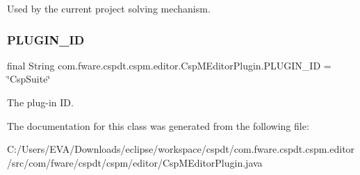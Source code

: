Used by the current project solving mechanism. 

\mbox{\label{classcom_1_1fware_1_1cspdt_1_1cspm_1_1editor_1_1_csp_m_editor_plugin_a52beb6e08f5faf5ef31066ebb304d825}} 
\subsubsection{\texorpdfstring{P\+L\+U\+G\+I\+N\+\_\+\+ID}{PLUGIN\_ID}}
{\footnotesize\ttfamily final String com.\+fware.\+cspdt.\+cspm.\+editor.\+Csp\+M\+Editor\+Plugin.\+P\+L\+U\+G\+I\+N\+\_\+\+ID = \char`\"{}Csp\+Suite\char`\"{}\hspace{0.3cm}{\ttfamily [static]}}



The plug-\/in ID. 



The documentation for this class was generated from the following file\+:\begin{DoxyCompactItemize}
\item 
C\+:/\+Users/\+E\+V\+A/\+Downloads/eclipse/workspace/cspdt/com.\+fware.\+cspdt.\+cspm.\+editor/src/com/fware/cspdt/cspm/editor/Csp\+M\+Editor\+Plugin.\+java\end{DoxyCompactItemize}
